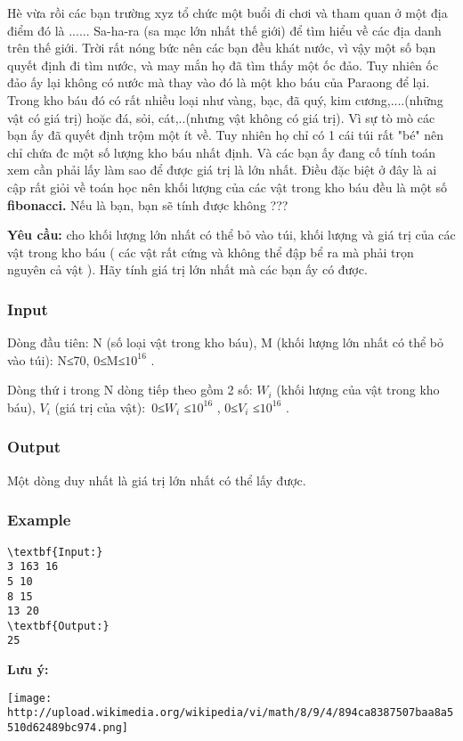 

Hè vừa rồi các bạn trường xyz tổ chức một buổi đi chơi và tham quan ở một địa điểm đó là ...... Sa-ha-ra (sa mạc lớn nhất thế giới) để tìm hiểu về các địa danh trên thế giới. Trời rất nóng bức nên các bạn đều khát nước, vì vậy một số bạn quyết định đi tìm nước, và may mắn họ đã tìm thấy một ốc đảo. Tuy nhiên ốc đảo ấy lại không có nước mà thay vào đó là một kho báu của Paraong để lại. Trong kho báu đó có rất nhiều loại như vàng, bạc, đã quý, kim cương,....(những vật có giá trị) hoặc đá, sỏi, cát,..(nhưng vật không có giá trị). Vì sự tò mò các bạn ấy đã quyết định trộm một ít về. Tuy nhiên họ chỉ có 1 cái túi rất "bé" nên chỉ chứa đc một số lượng kho báu nhất định. Và các bạn ấy đang cố tính toán xem cần phải lấy làm sao để được giá trị là lớn nhất. Điều đặc biệt ở đây là ai cập rất giỏi về toán học nên khối lượng của các vật trong kho báu đều là một số \textbf{ fibonacci. } Nếu là bạn, bạn sẽ tính được không ???

\textbf{Yêu cầu: } cho khối lượng lớn nhất có thể bỏ vào túi, khối lượng và giá trị của các vật trong kho báu ( các vật rất cứng và không thể đập bể ra mà phải trọn nguyên cả vật ). Hãy tính giá trị lớn nhất mà các bạn ấy có được.

\subsubsection{Input}

Dòng đầu tiên: N (số loại vật trong kho báu), M (khối lượng lớn nhất có thể bỏ vào túi): N≤70, 0≤M≤$10^{16}$ .

Dòng thứ i trong N dòng tiếp theo gồm 2 số: $W_{i}$ (khối lượng của vật trong kho báu), $V_{i}$ (giá trị của vật): 0≤$W_{i}$ ≤$10^{16}$ , 0≤$V_{i}$ ≤$10^{16}$ .

\subsubsection{Output}

Một dòng duy nhất là giá trị lớn nhất có thể lấy được.

\subsubsection{Example}
\begin{verbatim}
\textbf{Input:}
3 163 16
5 10
8 15
13 20
\textbf{Output:}
25\end{verbatim}

\textbf{Lưu ý:}


\texttt{[image: http://upload.wikimedia.org/wikipedia/vi/math/8/9/4/894ca8387507baa8a5510d62489bc974.png]}
